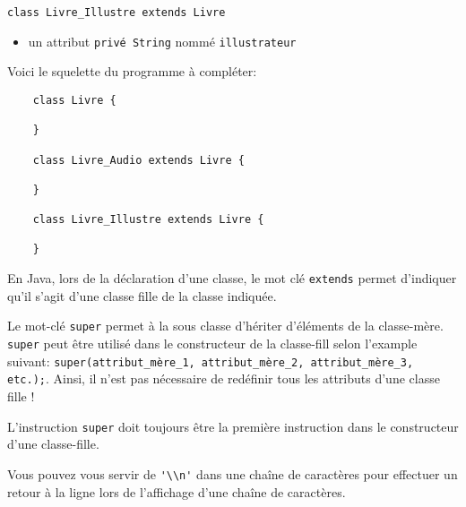 \begin{Exercice}[20 minutes]
\begin{itemize}
\end{itemize}
\lstinline{class Livre_Illustre extends Livre}
\begin{itemize}
	\item un attribut \lstinline{privé String} nommé \lstinline{illustrateur}

\end{itemize}

Voici le squelette du programme à compléter:

\begin{lstlisting}
	class Livre {

	}

	class Livre_Audio extends Livre {

	}

	class Livre_Illustre extends Livre {

	}\end{lstlisting}

\begin{conseil}
En Java, lors de la déclaration d'une classe, le mot clé \lstinline{extends} permet d'indiquer qu'il s'agit d'une classe fille de la classe indiquée. 

Le mot-clé \lstinline{super} permet à la sous classe d'hériter d'éléments de la classe-mère. \lstinline{super} peut être utilisé dans le constructeur de la classe-fill selon l'example suivant: \lstinline{super(attribut_mère_1, attribut_mère_2, attribut_mère_3, etc.);}. Ainsi, il n'est pas nécessaire de redéfinir tous les attributs d'une classe fille !

L'instruction \lstinline{super} doit toujours être la première instruction dans le constructeur d'une classe-fille.

Vous pouvez vous servir de \lstinline{'\\n'} dans une chaîne de caractères pour effectuer un retour à la ligne lors de l'affichage d'une chaîne de caractères.
\end{conseil}

\begin{solution}
	
\end{solution}

\end{Exercice}

